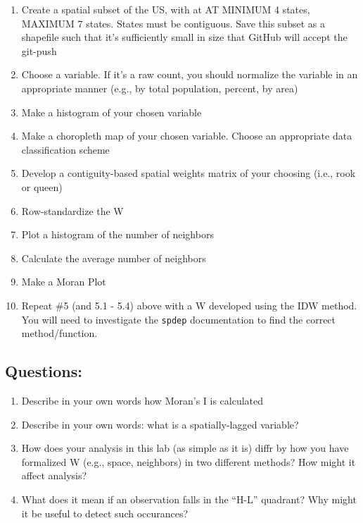 \documentclass[]{article}
\begin{document}
\begin{enumerate}
\def\labelenumi{\arabic{enumi}.}
\item
  Create a spatial subset of the US, with at AT MINIMUM 4 states,
  MAXIMUM 7 states. States must be contiguous. Save this subset as a
  shapefile such that it's sufficiently small in size that GitHub will
  accept the git-push
\item
  Choose a variable. If it's a raw count, you should normalize the
  variable in an appropriate manner (e.g., by total population, percent,
  by area)
\item
  Make a histogram of your chosen variable
\item
  Make a choropleth map of your chosen variable. Choose an appropriate
  data classiﬁcation scheme
\item
  Develop a contiguity-based spatial weights matrix of your choosing
  (i.e., rook or queen)
\item
  Row-standardize the W
\item
  Plot a histogram of the number of neighbors
\item
  Calculate the average number of neighbors
\item
  Make a Moran Plot
\item
  Repeat \#5 (and 5.1 - 5.4) above with a W developed using the IDW
  method. You will need to investigate the \texttt{spdep} documentation
  to find the correct method/function.
\end{enumerate}

\subsection{Questions:}\label{questions}

\begin{enumerate}
\def\labelenumi{\arabic{enumi}.}
\item
  Describe in your own words how Moran's I is calculated
\item
  Describe in your own words: what is a spatially-lagged variable?
\item
  How does your analysis in this lab (as simple as it is) diffr by how
  you have formalized W (e.g., space, neighbors) in two diﬀerent
  methods? How might it affect analysis?
\item
  What does it mean if an observation falls in the ``H-L'' quadrant? Why
  might it be useful to detect such occurances?
\end{enumerate}
\end{document}
